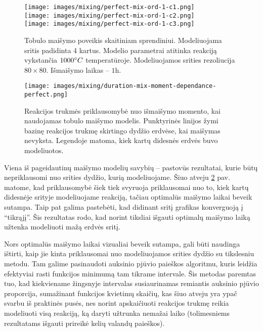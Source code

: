 \begin{figure}[h!]
  \centering
  \texttt{[image: images/mixing/perfect-mix-ord-1-c1.png]} \\ 
  \texttt{[image: images/mixing/perfect-mix-ord-1-c2.png]} \\
  \texttt{[image: images/mixing/perfect-mix-ord-1-c3.png]}
  \caption{Tobulo maišymo poveikis skaitiniam sprendiniui. Modeliuojama sritis padidinta 4 kartus. Modelio parametrai atitinka reakciją vykstančia $1000\degree C$ temperatūroje. Modeliuojamos srities rezoliucija $80\times80$. Išmaišymo laikas -- $1\text{h}. $}
  \label{fig:perfect-mix-larger-example}
\end{figure}

\begin{figure}[h!]
  \centering
  \texttt{[image: images/mixing/duration-mix-moment-dependance-perfect.png]}
  \caption{Reakcijos trukmės priklausomybė nuo išmaišymo momento, kai naudojamas tobulo maišymo modelis. Punktyrinės linijos žymi bazinę reakcijos trukmę skirtingo dydžio erdvėse, kai maišymas nevyksta. Legendoje matoma, kiek kartų didesnės erdvės buvo modeliuotos.}
  \label{fig:duration-mix-moment-perfect}
\end{figure}

Viena iš pageidautinų maišymo modelių savybių -- pastovūs rezultatai, kurie būtų nepriklausomi nuo srities dydžio, kurią modeliuojame. Šiuo atveju \ref{fig:duration-mix-moment-perfect} pav. matome, kad priklausomybė šiek tiek svyruoja priklausomai nuo to, kiek kartų didesnėje srityje modeliuojame reakciją, tačiau optimalūs maišymo laikai beveik sutampa. Taip pat galima pastebėti, kad didinant sritį grafikas konverguoją į \enquote{tikrąjį}. Šis rezultatas rodo, kad norint tiksliai išgauti optimalų maišymo laiką užtenka modeliuoti mažą erdvės sritį. 

Nors optimalūs maišymo laikai vizualiai beveik sutampa, gali būti naudinga ištirti, kaip jie kinta priklausomai nuo modeliuojamos srities dydžio su tikslesniu metodu. Tam galime pasinaudoti auksinio pjūvio paieškos algoritmu, kuris leidžia efektyviai rasti funkcijos minimumą tam tikrame intervale. Šis metodas paremtas tuo, kad kiekviename žingsnyje intervalas susiaurinamas remiantis auksinio pjūvio proporcija, sumažinant funkcijos kvietimų skaičių, kas šiuo atveju yra ypač svarbu iš praktinės pusės, nes norint apskaičiuoti reakcijos trukmę reikia modeliuoti visą reakciją, ką daryti užtrunka nemažai laiko (tolimesniems rezultatams išgauti prireikė kelių valandų paieškos). 


